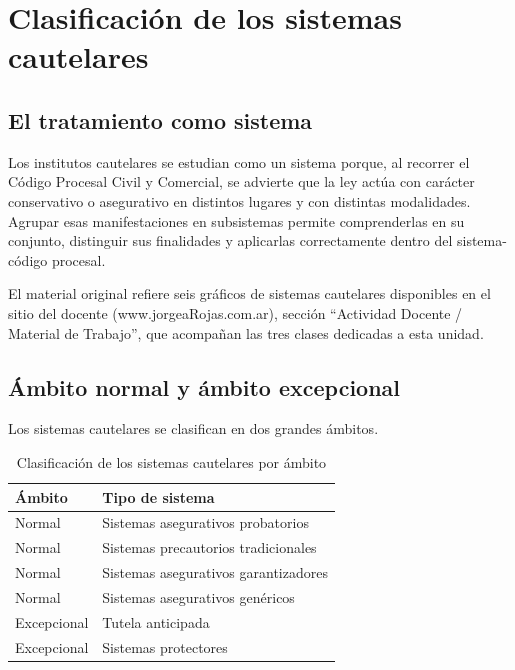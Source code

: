 \documentclass[12pt,oneside]{book}
\begin{document}
\section{Clasificación de los sistemas cautelares}

\subsection{El tratamiento como sistema}

Los institutos cautelares se estudian como un sistema porque, al recorrer el Código Procesal Civil y Comercial, se advierte que la ley actúa con carácter conservativo o asegurativo en distintos lugares y con distintas modalidades. Agrupar esas manifestaciones en subsistemas permite comprenderlas en su conjunto, distinguir sus finalidades y aplicarlas correctamente dentro del sistema-código procesal.

\begin{note}
El material original refiere seis gráficos de sistemas cautelares disponibles en el sitio del docente (www.jorgeaRojas.com.ar), sección ``Actividad Docente / Material de Trabajo'', que acompañan las tres clases dedicadas a esta unidad.
\end{note}

\subsection{Ámbito normal y ámbito excepcional}

Los sistemas cautelares se clasifican en dos grandes ámbitos.

\begin{table}[H]
\centering
\begin{tabularx}{\textwidth}{
    >{\raggedright\arraybackslash}p{}
    >{\raggedright\arraybackslash}X
}
\toprule
\textbf{Ámbito} & \textbf{Tipo de sistema} \\
\midrule
Normal & Sistemas asegurativos probatorios \\
Normal & Sistemas precautorios tradicionales \\
Normal & Sistemas asegurativos garantizadores \\
Normal & Sistemas asegurativos genéricos \\
Excepcional & Tutela anticipada \\
Excepcional & Sistemas protectores \\
\bottomrule
\end{tabularx}
\caption{Clasificación de los sistemas cautelares por ámbito}
\end{table}
\end{document}
